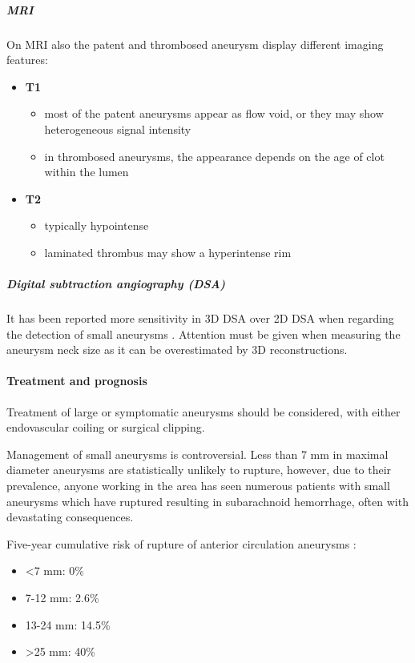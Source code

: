 \subparagraph{MRI}

On MRI also the patent and thrombosed aneurysm display different imaging features:

\begin{itemize}
	\item
	\textbf{T1}
	
	\begin{itemize}
		\item
		most of the patent aneurysms appear as flow void, or they may show heterogeneous signal intensity
		\item
		in thrombosed aneurysms, the appearance depends on the age of clot within the lumen
	\end{itemize}
	\item
	\textbf{T2}
	
	\begin{itemize}
		\item
		typically hypointense
		\item
		laminated thrombus may show a hyperintense rim
	\end{itemize}
\end{itemize}

\subparagraph{Digital subtraction angiography (DSA)}

It has been reported more sensitivity in 3D DSA over 2D DSA when regarding the detection of small aneurysms . Attention must be given when measuring the aneurysm neck size as it can be overestimated by 3D reconstructions.

\paragraph{Treatment and prognosis}

Treatment of large or symptomatic aneurysms should be considered, with either endovascular coiling or surgical clipping.

Management of small aneurysms is controversial. Less than 7 mm in maximal diameter aneurysms are statistically unlikely to rupture, however, due to their prevalence, anyone working in the area has seen numerous patients with small aneurysms which have ruptured resulting in subarachnoid hemorrhage, often with devastating consequences.

Five-year cumulative risk of rupture of anterior circulation aneurysms :

\begin{itemize}
	\item
	\textless7 mm: 0\%
	\item
	7-12 mm: 2.6\%
	\item
	13-24 mm: 14.5\%
	\item
	\textgreater25 mm: 40\%
\end{itemize}

